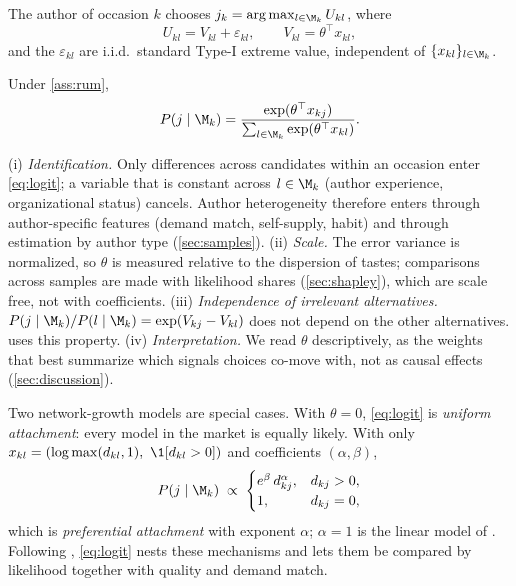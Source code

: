 \begin{assumption}
\label{ass:rum}
The author of occasion $k$ chooses $j_k = \arg\max_{l \in \M_k} U_{kl}$, where
\[
  U_{kl} = V_{kl} + \varepsilon_{kl}, \qquad V_{kl} = \theta^\top x_{kl},
\]
and the $\varepsilon_{kl}$ are i.i.d.\ standard Type-I extreme value, independent of $\{x_{kl}\}_{l \in \M_k}$.
\end{assumption}

\begin{lemma}
\label{lem:logit}
Under \cref{ass:rum},
\begin{equation}
  P(j \mid \M_k) = \frac{\exp(\theta^\top x_{kj})}{\sum_{l \in \M_k} \exp(\theta^\top x_{kl})}.
  \label{eq:logit}
\end{equation}
\end{lemma}

\begin{remark}
\label{rem:logit}
(i) \emph{Identification.} Only differences across candidates within an occasion enter \eqref{eq:logit}; a
variable that is constant across $l \in \M_k$ (author experience, organizational status) cancels. Author
heterogeneity therefore enters through author-specific features (demand match, self-supply, habit) and through
estimation by author type (\cref{sec:samples}).
(ii) \emph{Scale.} The error variance is normalized, so $\theta$ is measured relative to the dispersion of tastes;
comparisons across samples are made with likelihood shares (\cref{sec:shapley}), which are scale free, not with
coefficients.
(iii) \emph{Independence of irrelevant alternatives.} $P(j \mid \M_k) / P(l \mid \M_k) = \exp(V_{kj} - V_{kl})$
does not depend on the other alternatives.  uses this property.
(iv) \emph{Interpretation.} We read $\theta$ descriptively, as the weights that best summarize which signals
choices co-move with, not as causal effects (\cref{sec:discussion}).
\end{remark}

Two network-growth models are special cases. With $\theta = 0$, \eqref{eq:logit} is \emph{uniform attachment}:
every model in the market is equally likely. With only $x_{kl} = (\log \max(d_{kl},1),\ \1[d_{kl}>0])$ and
coefficients $(\alpha, \beta)$,
\[
  P(j \mid \M_k) \;\propto\;
  \begin{cases} e^{\beta}\, d_{kj}^{\alpha}, & d_{kj} > 0, \\ 1, & d_{kj} = 0, \end{cases}
\]
which is \emph{preferential attachment} with exponent $\alpha$; $\alpha = 1$ is the linear model of
\citet{barabasi1999emergence}. Following \citet{overgoor2019choosing}, \eqref{eq:logit} nests these mechanisms and
lets them be compared by likelihood together with quality and demand match.

